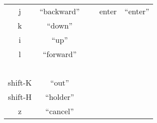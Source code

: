 \documentclass[landscape,letterpaper]{article}
\begin{document}
\begin{tabular}{|c|c|c|c|c|}
       j      &      ``backward''          & ~  &       enter    &   ``enter''               \\
       k         &   ``down'' & ~ & ~ & ~              \\
       i          &  ``up'' & ~ & ~ & ~  \\
       l         &   ``forward'' & ~ & ~ & ~  \\
 ~ & ~  & ~ & ~ & ~  \\
       shift-K     &   ``out'' & ~ & ~ & ~ \\
       shift-H     &    ``holder'' & ~ & ~ & ~  \\
       z          &  ``cancel'' & ~ & ~ & ~
\end{tabular}       




 
\end{document}
